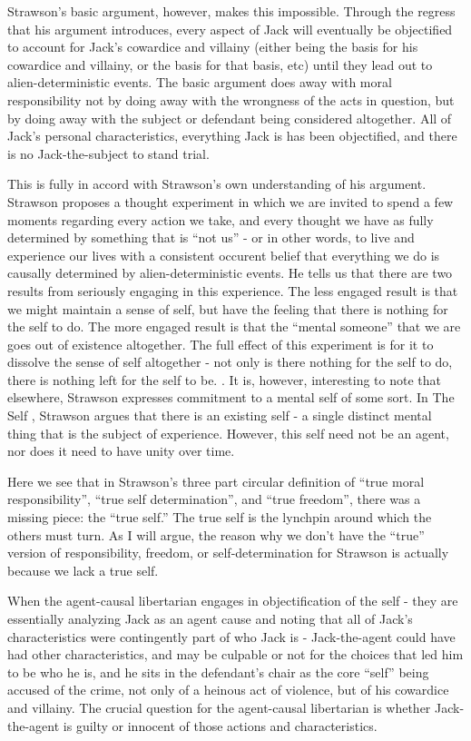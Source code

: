 \documentclass[phd,12pt,oneside,paper=letterpaper]{ubcthesis}
\begin{document}
Strawson's basic argument, however, makes this impossible. Through the regress that his argument introduces, every aspect of Jack will eventually be objectified to account for Jack's cowardice and villainy (either being the basis for his cowardice and villainy, or the basis for that basis, etc) until they lead out to alien-deterministic events. The basic argument does away with moral responsibility not by doing away with the wrongness of the acts in question, but by doing away with the subject or defendant being considered altogether. All of Jack's personal characteristics, everything Jack is has been objectified, and there is no Jack-the-subject to stand trial.

This is fully in accord with Strawson's own understanding of his argument. Strawson proposes a thought experiment in which we are invited to spend a few moments regarding every action we take, and every thought we have as fully determined by something that is ``not us'' - or in other words, to live and experience our lives with a consistent occurent belief that everything we do is causally determined by alien-deterministic events. He tells us that there are two results from seriously engaging in this experience. The less engaged result is that we might maintain a sense of self, but have the feeling that there is nothing for the self to do. The more engaged result is that the ``mental someone'' that we are goes out of existence altogether. The full effect of this experiment is for it to dissolve the sense of self altogether - not only is there nothing for the self to do, there is nothing left for the self to be. \citep[p 2]{strawsong2010}. It is, however, interesting to note that elsewhere, Strawson expresses commitment to a mental self of some sort. In The Self \citep{strawsong1997}, Strawson argues that there is an existing self - a single distinct mental thing that is the subject of experience. However, this self need not be an agent, nor does it need to have unity over time. 

Here we see that in Strawson's three part circular definition of ``true moral responsibility'', ``true self determination'', and ``true freedom'', there was a missing piece: the ``true self.'' The true self is the lynchpin around which the others must turn. As I will argue, the reason why we don't have the ``true'' version of responsibility, freedom, or self-determination for Strawson is actually because we lack a true self.

When the agent-causal libertarian engages in objectification of the self - they are essentially analyzing Jack as an agent cause and noting that all of Jack's characteristics were contingently part of who Jack is - Jack-the-agent could have had other characteristics, and may be culpable or not for the choices that led him to be who he is, and he sits in the defendant's chair as the core ``self'' being accused of the crime, not only of a heinous act of violence, but of his cowardice and villainy. The crucial question for the agent-causal libertarian is whether Jack-the-agent is guilty or innocent of those actions and characteristics.
\end{document}
